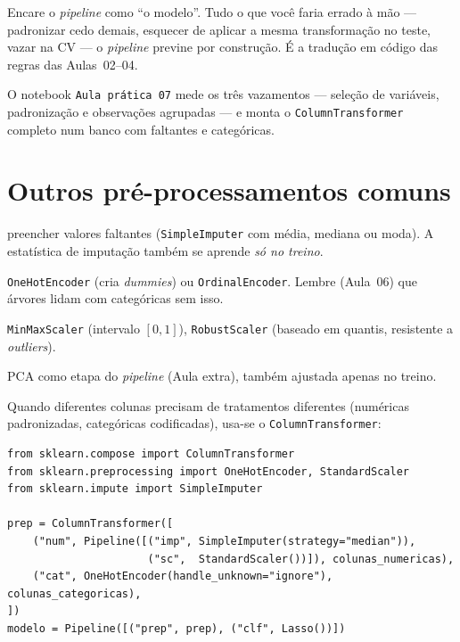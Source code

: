 \documentclass[11pt,a4paper]{article}
\begin{document}
\begin{ideia}
Encare o \emph{pipeline} como ``o modelo''. Tudo o que você faria errado à mão ---
padronizar cedo demais, esquecer de aplicar a mesma transformação no teste, vazar
na CV --- o \emph{pipeline} previne por construção. É a tradução em código das regras
das Aulas~02--04.
\end{ideia}

O notebook \texttt{Aula prática 07} mede os três vazamentos --- seleção de
variáveis, padronização e observações agrupadas --- e monta o
\texttt{ColumnTransformer} completo num banco com faltantes e categóricas.

\section{Outros pré-processamentos comuns}
\begin{description}[leftmargin=2.6cm,style=nextline]
  \item[Imputação] preencher valores faltantes (\texttt{SimpleImputer} com média,
        mediana ou moda). A estatística de imputação também se aprende \emph{só no
        treino}.
  \item[Codificação de categóricas] \texttt{OneHotEncoder} (cria \emph{dummies}) ou
        \texttt{OrdinalEncoder}. Lembre (Aula~06) que árvores lidam com categóricas
        sem isso.
  \item[Escalas alternativas] \texttt{MinMaxScaler} (intervalo $[0,1]$),
        \texttt{RobustScaler} (baseado em quantis, resistente a \emph{outliers}).
  \item[Redução de dimensão] PCA como etapa do \emph{pipeline} (Aula extra),
        também ajustada apenas no treino.
\end{description}

Quando diferentes colunas precisam de tratamentos diferentes (numéricas
padronizadas, categóricas codificadas), usa-se o \texttt{ColumnTransformer}:
\begin{lstlisting}
from sklearn.compose import ColumnTransformer
from sklearn.preprocessing import OneHotEncoder, StandardScaler
from sklearn.impute import SimpleImputer

prep = ColumnTransformer([
    ("num", Pipeline([("imp", SimpleImputer(strategy="median")),
                      ("sc",  StandardScaler())]), colunas_numericas),
    ("cat", OneHotEncoder(handle_unknown="ignore"), colunas_categoricas),
])
modelo = Pipeline([("prep", prep), ("clf", Lasso())])
\end{lstlisting}
\end{document}
